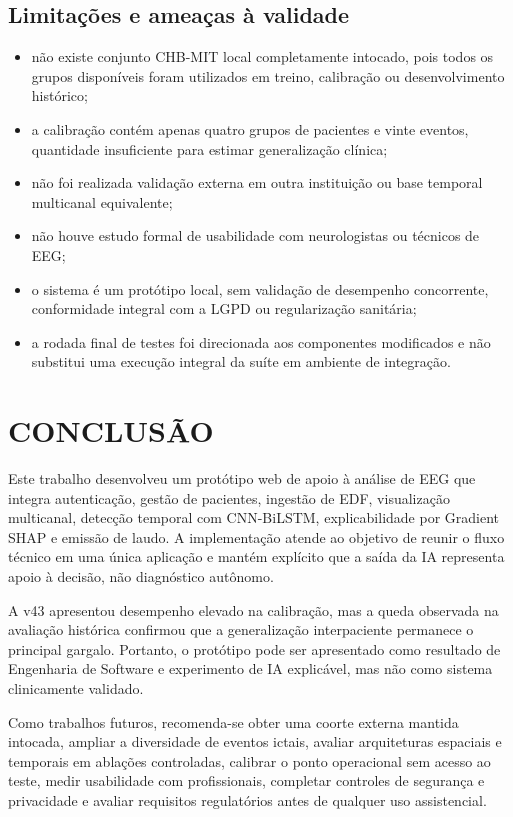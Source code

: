 \section{Limitações e ameaças à validade}
\begin{itemize}[leftmargin=1.25cm,itemsep=0pt,topsep=0pt]
\item não existe conjunto CHB-MIT local completamente intocado, pois todos os grupos disponíveis foram utilizados em treino, calibração ou desenvolvimento histórico;
\item a calibração contém apenas quatro grupos de pacientes e vinte eventos, quantidade insuficiente para estimar generalização clínica;
\item não foi realizada validação externa em outra instituição ou base temporal multicanal equivalente;
\item não houve estudo formal de usabilidade com neurologistas ou técnicos de EEG;
\item o sistema é um protótipo local, sem validação de desempenho concorrente, conformidade integral com a LGPD ou regularização sanitária;
\item a rodada final de testes foi direcionada aos componentes modificados e não substitui uma execução integral da suíte em ambiente de integração.
\end{itemize}
\chapter{CONCLUSÃO}
Este trabalho desenvolveu um protótipo web de apoio à análise de EEG que integra autenticação, gestão de pacientes, ingestão de EDF, visualização multicanal, detecção temporal com CNN-BiLSTM, explicabilidade por Gradient SHAP e emissão de laudo. A implementação atende ao objetivo de reunir o fluxo técnico em uma única aplicação e mantém explícito que a saída da IA representa apoio à decisão, não diagnóstico autônomo.

A v43 apresentou desempenho elevado na calibração, mas a queda observada na avaliação histórica confirmou que a generalização interpaciente permanece o principal gargalo. Portanto, o protótipo pode ser apresentado como resultado de Engenharia de Software e experimento de IA explicável, mas não como sistema clinicamente validado.

Como trabalhos futuros, recomenda-se obter uma coorte externa mantida intocada, ampliar a diversidade de eventos ictais, avaliar arquiteturas espaciais e temporais em ablações controladas, calibrar o ponto operacional sem acesso ao teste, medir usabilidade com profissionais, completar controles de segurança e privacidade e avaliar requisitos regulatórios antes de qualquer uso assistencial.

